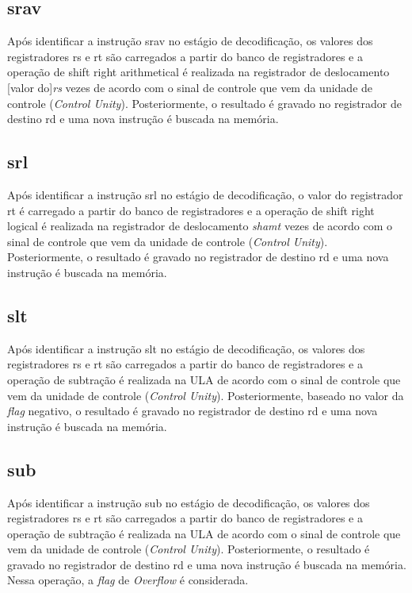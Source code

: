 \documentclass{article}
\begin{document}
    \subsection{srav}
    Após identificar a instrução srav no estágio de decodificação, os valores dos registradores rs e rt são carregados a partir do banco de registradores e a operação de shift right arithmetical é realizada na registrador de deslocamento [valor do]{\it rs} vezes de acordo com o sinal de controle que vem da unidade de controle ({\it Control Unity}). Posteriormente, o resultado é gravado no registrador de destino rd e uma nova instrução é buscada na memória.
    \\    
    \subsection{srl}
    Após identificar a instrução srl no estágio de decodificação, o valor do registrador rt é carregado a partir do banco de registradores e a operação de shift right logical é realizada na registrador de deslocamento {\it shamt} vezes de acordo com o sinal de controle que vem da unidade de controle ({\it Control Unity}). Posteriormente, o resultado é gravado no registrador de destino rd e uma nova instrução é buscada na memória.
    \\    
    \subsection{slt}
     Após identificar a instrução slt no estágio de decodificação, os valores dos registradores rs e rt são carregados a partir do banco de registradores e a operação de subtração é realizada na ULA de acordo com o sinal de controle que vem da unidade de controle ({\it Control Unity}). Posteriormente, baseado no valor da {\it flag} negativo, o resultado é gravado no registrador de destino rd e uma nova instrução é buscada na memória.
    \\
    \subsection{sub}
     Após identificar a instrução sub no estágio de decodificação, os valores dos registradores rs e rt são carregados a partir do banco de registradores e a operação de subtração é realizada na ULA de acordo com o sinal de controle que vem da unidade de controle ({\it Control Unity}). Posteriormente, o resultado é gravado no registrador de destino rd e uma nova instrução é buscada na memória. Nessa operação, a {\it flag} de {\it Overflow} é considerada.
    \\
\end{document}
